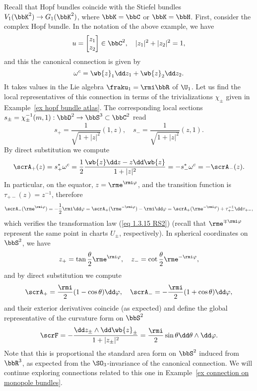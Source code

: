 \begin{example}\label{ex connection on Hopf bundle}
    Recall that Hopf bundles coincide with the Stiefel bundles $V_1(\bbK^2)\to G_1(\bbK^2)$, where $\bbK=\bbC$ or $\bbK=\bbH$. First, consider the complex Hopf bundle. In the notation of the above example, we have
    \[u=\begin{bmatrix}
        z_1\\z_2
    \end{bmatrix}
    \in\bbC^2,\quad |z_1|^2+|z_2|^2=1,\]
    and this the canonical connection is given by
    \[\omega^c=\wb{z}_1\dd z_1+\wb{z}_2\dd z_2.\]
    It takes values in the Lie algebra $\fraku_1=\rmi \bbR$ of $\U_1$. Let us find the local representatives of this connection in terms of the trivializations $\chi_\pm$ given in Example~\ref{ex hopf bundle atlas}. The corresponding local sections $s_\pm=\chi^{-1}_\pm(m,1):\bbD^2\to \bbS^3\subset\bbC^2$ read
    \[s_+=\frac{1}{\sqrt{1+|z|^2}}(1,z),\quad s_-=\frac{1}{\sqrt{1+|z|^2}}(z,1).\]
    By direct substitution we compute
    \[\scrA_+(z)=s_+^\ast \omega^c=\frac12\frac{\wb{z}\dd z-z\dd \wb{z}}{1+|z|^2}=-s_-^\ast\omega^c=-\scrA_-(z).\]
    In particular, on the equator, $z=\rme^{\rmi \varphi}$, and the transition function is $\tau_{+-}(z)=z^{-1}$, therefore
    \[\scrA_-(\rme^{\rmi \varphi})=-\frac12\rmi \dd\varphi=\scrA_+(\rme^{-\rmi \varphi})-\rmi\dd\varphi=\scrA_+(\rme^{-\rmi \varphi})+\tau_{+-}^{-1}\dd\tau_{+-},\]
    which verifies the transformation law (\ref{eq 1.3.15 RS2}) (recall that $\rme^{\mp\rmi \varphi}$ represent the same point in charts $U_\pm$, respectively). In spherical coordinates on $\bbS^2$, we have \[z_+=\tan\frac{\theta}{2}\rme^{\rmi\varphi}, \quad z_-=\cot\frac{\theta}{2}\rme^{-\rmi\varphi},\]
    and by direct substitution we compute
    \[\scrA_+=\frac{\rmi}{2}(1-\cos\theta)\dd\varphi,\quad \scrA_-=-\frac{\rmi}{2}(1+\cos\theta)\dd\varphi,\]
    and their exterior derivatives coincide (as expected) and define the global representative of the curvature form on $\bbS^2$
    \[\scrF=-\frac{\dd z_\pm\wedge \dd\wb{z}_\pm}{1+|z_\pm|^2}=\frac{\rmi}{2}\sin\theta \dd\theta\wedge\dd\varphi.\]
    Note that this is proportional the standard area form on $\bbS^2$ induced from $\bbR^3$, as expected from the $\SO_3$-invariance of the canonical connection.
    We will continue exploring connections related to this one in Example~\ref{ex connection on monopole bundles}.


\end{example}
